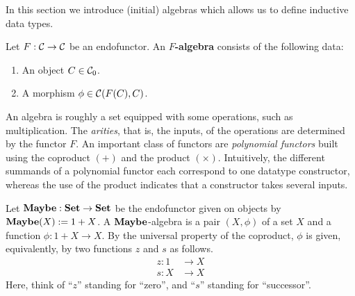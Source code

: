 In this section we introduce (initial) algebras which allows us to define inductive data types.

\begin{dfn} Let $F:\mathcal{C}\to \mathcal{C}$ be an endofunctor. An \textbf{$F$-algebra} consists of the following data:
\begin{enumerate}
\item An object $C\in {\mathcal{C}}_0$.
\item A morphism $\phi \in {\mathcal{C}}(F(C),C)$.
\end{enumerate}
\end{dfn}

\begin{intu}
An algebra is roughly a set equipped with some operations, such as multiplication.
The \emph{arities}, that is, the inputs, of the operations are determined by the functor $F$.
An important class of functors are \emph{polynomial functors} built using the coproduct $(+)$ and the product $(\times)$.
Intuitively, the different summands of a polynomial functor each correspond to one datatype constructor, whereas the use of the product indicates that a constructor takes several inputs.
\end{intu}

\begin{exa}
 Let $\mathbf{Maybe} : \mathbf{Set} \to \mathbf{Set}$ be the endofunctor given on objects by $\mathbf{Maybe}(X) := 1 + X$. 
 A $\mathbf{Maybe}$-algebra is a pair $(X,\phi)$ of a set $X$ and a function $\phi : 1 + X \to X$.
 By the universal property of the coproduct, $\phi$ is given, equivalently,
 by two functions $z$ and $s$ as follows.
 \begin{align*}
    z : 1 &\to X
    \\
    s : X &\to X
 \end{align*}
Here, think of ``$z$'' standing for ``zero'', and ``$s$'' standing for ``successor''.
\end{exa}


